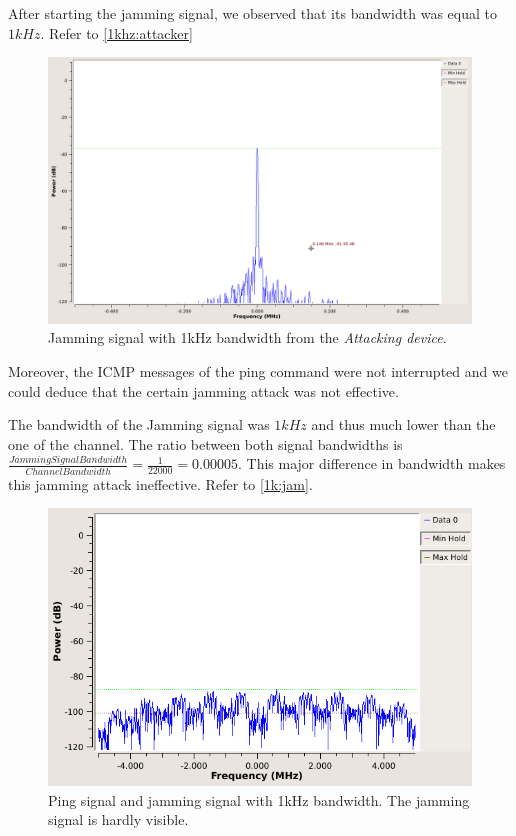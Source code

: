 \documentclass[12pt,a4paper]{article}
\begin{document}
	After starting the jamming signal, we observed that its bandwidth was equal to $1kHz$. Refer to \autoref{1khz:attacker}
	\begin{figure}
		\includegraphics[width=\textwidth]{images/attack_1kHz.png}
		\caption{Jamming signal with 1kHz bandwidth from the \emph{Attacking device}.}
		\label{1khz:attacker}
	\end{figure}
	
	 Moreover, the ICMP messages of the ping command were not interrupted and we could deduce that the certain jamming attack was not effective.

	The bandwidth of the Jamming signal was $1 kHz$ and thus much lower than the one of the channel. The ratio between both signal bandwidths is $\frac{Jamming Signal Bandwidth}{Channel Bandwidth} = \frac{1}{22000} = 0.00005$. This major difference in bandwidth makes this jamming attack ineffective. Refer to \autoref{1k:jam}.
	\begin{figure}
		\includegraphics[width=\textwidth]{images/mon_1k_ping.png}
%		
	\caption{Ping signal and jamming signal with 1kHz bandwidth. The jamming signal is hardly visible.}
	\label{1k:jam}
	\end{figure}
	
\end{document}
